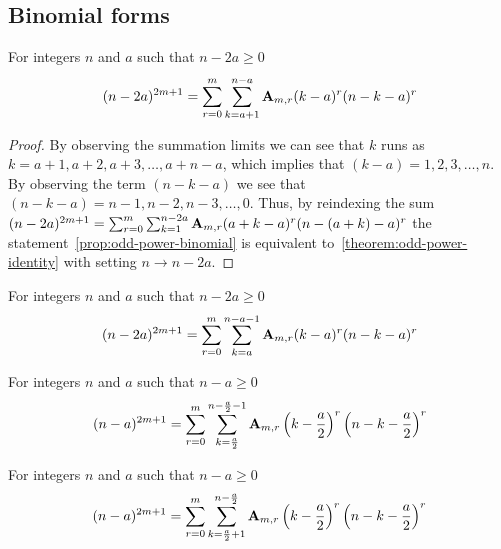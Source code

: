 \subsection{Binomial forms}\label{subsec:binomial-forms}
\begin{proposition}
    \label{prop:odd-power-binomial}
    For integers $n$ and $a$ such that $n-2a \geq 0$
    \begin{align*}
    (n-2a)
        ^{2m+1} = \sum_{r=0}^{m} \sum_{k=a+1}^{n-a} {\mathbf{A}} \sb{m,r} (k-a)^r (n-k-a)^r
    \end{align*}
    \begin{proof}
        By observing the summation limits we can see that $k$ runs as $k=a+1,a+2,a+3,\ldots,a+n-a$, which
        implies that $(k-a)=1,2,3,\ldots, n$.
        By observing the term $(n-k-a)$ we see that $(n-k-a)=n-1,n-2,n-3,\ldots,0$.
        Thus, by reindexing the sum
        $(n-2a)^{2m+1} = \sum_{r=0}^{m} \sum_{k=1}^{n-2a} {\mathbf{A}} \sb{m,r} (a+k-a)^r (n-(a+k)-a)^r$
        the statement~\eqref{prop:odd-power-binomial} is equivalent to~\eqref{theorem:odd-power-identity}
        with setting $n \rightarrow n-2a$.
    \end{proof}
\end{proposition}

\begin{corollary}
    \label{prop:odd-power-binomial-shifted}
    For integers $n$ and $a$ such that $n-2a \geq 0$
    \begin{align*}
    (n-2a)
        ^{2m+1} = \sum_{r=0}^{m} \sum_{k=a}^{n-a-1} {\mathbf{A}} \sb{m,r} (k-a)^r (n-k-a)^r
    \end{align*}
\end{corollary}

\begin{corollary}
    For integers $n$ and $a$ such that $n-a \geq 0$
    \begin{align*}
    (n-a)
        ^{2m+1} = \sum_{r=0}^{m} \sum_{k=\frac{a}{2}}^{n-\frac{a}{2}-1} {\mathbf{A}} \sb{m,r} \left( k-\frac{a}{2} \right)^r \left(n-k-\frac{a}{2} \right)^r
    \end{align*}
\end{corollary}

\begin{corollary}
    For integers $n$ and $a$ such that $n-a \geq 0$
    \begin{align*}
    (n-a)
        ^{2m+1} = \sum_{r=0}^{m} \sum_{k=\frac{a}{2}+1}^{n-\frac{a}{2}} {\mathbf{A}} \sb{m,r} \left( k-\frac{a}{2} \right)^r \left(n-k-\frac{a}{2} \right)^r
    \end{align*}
\end{corollary}

